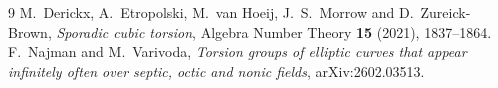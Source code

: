 \documentclass[11pt]{article}
\begin{document}

\begin{thebibliography}{9}
 M.~Derickx, A.~Etropolski, M.~van Hoeij, J.~S.~Morrow and D.~Zureick-Brown,
\emph{Sporadic cubic torsion}, Algebra Number Theory \textbf{15} (2021), 1837--1864.
 F.~Najman and M.~Varivoda,
\emph{Torsion groups of elliptic curves that appear infinitely often over septic, octic and nonic fields}, arXiv:2602.03513.
\end{thebibliography}
\end{document}
